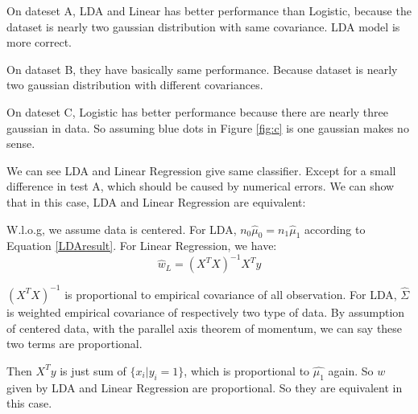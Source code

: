 \documentclass{article}
\begin{document}
	On dateset A, LDA and Linear has better performance than Logistic, because the dataset is nearly two gaussian distribution with same covariance. LDA model is more correct.
	
	On dataset B, they have basically same performance. Because dataset is nearly two gaussian distribution with different covariances.
	
	On dateset C, Logistic has better performance because there are nearly three gaussian in data. So assuming blue dots in Figure \ref{fig:c} is one gaussian makes no sense.
	
	We can see LDA and Linear Regression give same classifier. Except for a small difference in test A, which should be caused by numerical errors. We can show that in this case, LDA and Linear Regression are equivalent:
	
	W.l.o.g, we assume data is centered. For LDA, $n_0 \hat{\mu}_0=n_1 \hat{\mu}_1$ according to Equation \ref{LDAresult}. For Linear Regression, we have:
	$$
	\hat{w}_L = (X^T X)^{-1} X^T y
	$$
	
	$(X^T X)^{-1}$ is proportional to empirical covariance of all observation. For LDA, $\hat{\Sigma}$ is weighted empirical covariance of respectively two type of data. By assumption of centered data, with the parallel axis theorem of momentum, we can say these two terms are proportional.
	
	Then $X^T y$ is just sum of $\{x_i|y_i=1\}$, which is proportional to $\hat{\mu_1}$ again. So $w$ given by LDA and Linear Regression are proportional. So they are equivalent in this case.
\end{document}
